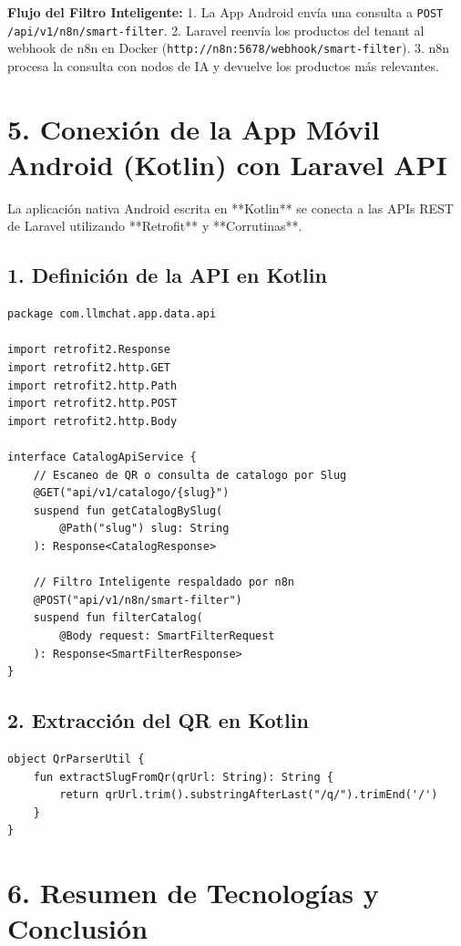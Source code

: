 \documentclass[12pt]{article}
\begin{document}
\textbf{Flujo del Filtro Inteligente:}
1. La App Android envía una consulta a \texttt{POST /api/v1/n8n/smart-filter}.
2. Laravel reenvía los productos del tenant al webhook de n8n en Docker (\texttt{http://n8n:5678/webhook/smart-filter}).
3. n8n procesa la consulta con nodos de IA y devuelve los productos más relevantes.

\newpage
\section{5. Conexión de la App Móvil Android (Kotlin) con Laravel API}

La aplicación nativa Android escrita en **Kotlin** se conecta a las APIs REST de Laravel utilizando **Retrofit** y **Corrutinas**.

\subsection{1. Definición de la API en Kotlin}
\begin{lstlisting}[language={}, caption={CatalogApiService.kt en Kotlin}]
package com.llmchat.app.data.api

import retrofit2.Response
import retrofit2.http.GET
import retrofit2.http.Path
import retrofit2.http.POST
import retrofit2.http.Body

interface CatalogApiService {
    // Escaneo de QR o consulta de catalogo por Slug
    @GET("api/v1/catalogo/{slug}")
    suspend fun getCatalogBySlug(
        @Path("slug") slug: String
    ): Response<CatalogResponse>

    // Filtro Inteligente respaldado por n8n
    @POST("api/v1/n8n/smart-filter")
    suspend fun filterCatalog(
        @Body request: SmartFilterRequest
    ): Response<SmartFilterResponse>
}
\end{lstlisting}

\subsection{2. Extracción del QR en Kotlin}
\begin{lstlisting}[language={}, caption={QrParserUtil.kt}]
object QrParserUtil {
    fun extractSlugFromQr(qrUrl: String): String {
        return qrUrl.trim().substringAfterLast("/q/").trimEnd('/')
    }
}
\end{lstlisting}

\newpage
\section{6. Resumen de Tecnologías y Conclusión}
\end{document}
